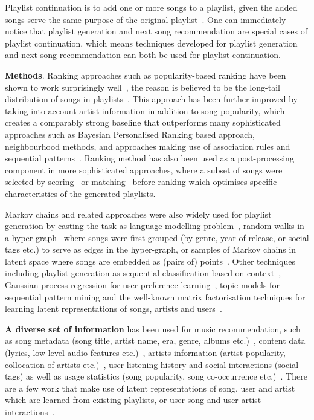 Playlist continuation is to add one or more songs to a playlist,
given the added songs serve the same purpose of the original playlist~\cite{schedl2017,recsysch2018}.
One can immediately notice that playlist generation and next song recommendation are special cases
of playlist continuation, which means techniques developed for playlist generation and
next song recommendation can both be used for playlist continuation.


{\bf Methods}.
Ranking approaches such as popularity-based ranking have been shown to
work surprisingly well~\cite{mcfee2012million,bonnin2013evaluating},
the reason is believed to be the long-tail distribution of songs in
playlists~\cite{cremonesi2010performance,bonnin2013evaluating}.
%
This approach has been further improved by taking into account artist information in addition to
song popularity, which creates a comparably strong baseline that outperforms many sophisticated
approaches such as Bayesian Personalised Ranking based approach, neighbourhood methods, and approaches
making use of association rules and sequential patterns~\cite{mcfee2012million,bonnin2013evaluating}.
%
Ranking method has also been used as a post-processing component in more sophisticated approaches,
where a subset of songs were selected by scoring~\cite{jannach2015beyond} or matching~\cite{hariri2012context}
before ranking which optimises specific characteristics of the generated playlists.


Markov chains and related approaches were also widely used for playlist generation by casting the task
as language modelling problem~\cite{mcfee2011natural},
random walks in a hyper-graph~\cite{mcfee2012hypergraph} where songs were first grouped (by genre,
year of release, or social tags etc.) to serve as edges in the hyper-graph, or samples of Markov chains
in latent space where songs are embedded as (pairs of) points~\cite{chen2012playlist}.
%
Other techniques including playlist generation as sequential classification based on context~\cite{ben2017groove},
Gaussian process regression for user preference learning~\cite{platt2002learning},
topic models for sequential pattern mining and the well-known matrix factorisation techniques for learning
latent representations of songs, artists and users~\cite{mcfee2012hypergraph,chen2012playlist,ben2017groove}.


{\bf A diverse set of information} has been used for music recommendation,
such as song metadata (\eg song title, artist name, era, genre, albums etc.)~\cite{hariri2012context,platt2002learning},
content data (\eg lyrics, low level audio features etc.)~\cite{mcfee2011natural,mcfee2012hypergraph,jannach2015beyond,ben2017groove},
artists information (\eg artist popularity, collocation of artists etc.)~\cite{bonnin2013evaluating,ben2017groove},
user listening history and social interactions (\eg social tags) as well as usage statistics (\eg song popularity,
song co-occurrence etc.)~\cite{mcfee2012hypergraph,hariri2012context,bonnin2013evaluating,jannach2015beyond,ben2017groove}.
There are a few work that make use of latent representations of song, user and artist which are learned from existing playlists,
or user-song and user-artist interactions~\cite{chen2012playlist,ben2017groove}.

